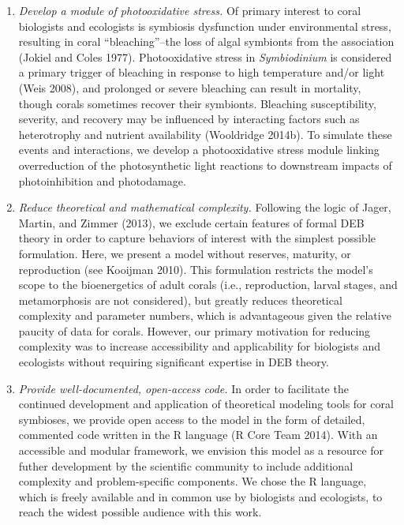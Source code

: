 \documentclass[]{elsarticle} %
\begin{document}
\begin{enumerate}
\def\labelenumi{\arabic{enumi}.}
\item
  \emph{Develop a module of photooxidative stress.} Of primary interest
  to coral biologists and ecologists is symbiosis dysfunction under
  environmental stress, resulting in coral ``bleaching''--the loss of
  algal symbionts from the association (Jokiel and Coles 1977).
  Photooxidative stress in \emph{Symbiodinium} is considered a primary
  trigger of bleaching in response to high temperature and/or light
  (Weis 2008), and prolonged or severe bleaching can result in
  mortality, though corals sometimes recover their symbionts. Bleaching
  susceptibility, severity, and recovery may be influenced by
  interacting factors such as heterotrophy and nutrient availability
  (Wooldridge 2014b). To simulate these events and interactions, we
  develop a photooxidative stress module linking overreduction of the
  photosynthetic light reactions to downstream impacts of
  photoinhibition and photodamage.
\item
  \emph{Reduce theoretical and mathematical complexity.} Following the
  logic of Jager, Martin, and Zimmer (2013), we exclude certain features
  of formal DEB theory in order to capture behaviors of interest with
  the simplest possible formulation. Here, we present a model without
  reserves, maturity, or reproduction (see Kooijman 2010). This
  formulation restricts the model's scope to the bioenergetics of adult
  corals (i.e., reproduction, larval stages, and metamorphosis are not
  considered), but greatly reduces theoretical complexity and parameter
  numbers, which is advantageous given the relative paucity of data for
  corals. However, our primary motivation for reducing complexity was to
  increase accessibility and applicability for biologists and ecologists
  without requiring significant expertise in DEB theory.
\item
  \emph{Provide well-documented, open-access code.} In order to
  facilitate the continued development and application of theoretical
  modeling tools for coral symbioses, we provide open access to the
  model in the form of detailed, commented code written in the R
  language (R Core Team 2014). With an accessible and modular framework,
  we envision this model as a resource for futher development by the
  scientific community to include additional complexity and
  problem-specific components. We chose the R language, which is freely
  available and in common use by biologists and ecologists, to reach the
  widest possible audience with this work.
\end{enumerate}
\end{document}
